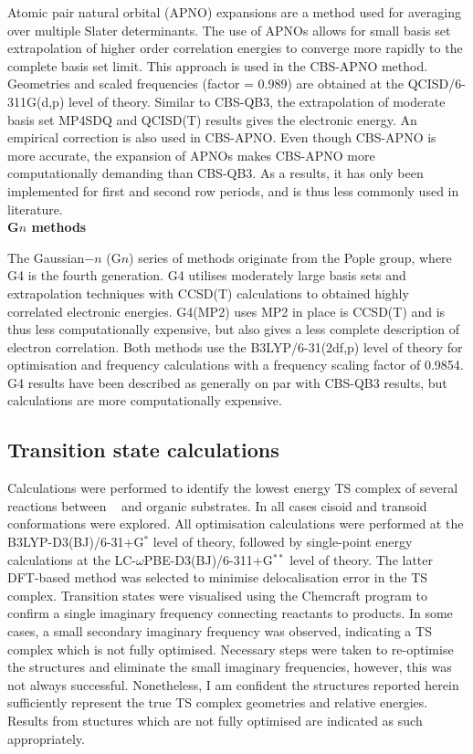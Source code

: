 Atomic pair natural orbital (APNO) expansions are a method used for averaging over multiple Slater determinants. The use of APNOs allows for small basis set extrapolation of higher order correlation energies to converge more rapidly to the complete basis set limit. This approach is used in the CBS-APNO method.\cite{Ochterski1996} Geometries and scaled frequencies (factor = 0.989) are obtained at the QCISD/6-311G(d,p) level of theory. Similar to CBS-QB3, the extrapolation of moderate basis set MP4SDQ and QCISD(T) results gives the electronic energy. An empirical correction is also used in CBS-APNO. Even though CBS-APNO is more accurate, the expansion of APNOs makes CBS-APNO more computationally demanding than CBS-QB3. As a results, it has only been implemented for first and second row periods, and is thus less commonly used in literature.
\\

\noindent \textbf{G$n$ methods}

The Gaussian$-n$ (G$n$) series of methods originate from the Pople group,\cite{Pople1989} where G4 is the fourth generation. G4 utilises moderately large basis sets and extrapolation techniques with CCSD(T) calculations to obtained highly correlated electronic energies. G4(MP2) uses MP2 in place is CCSD(T) and is thus less computationally expensive, but also gives a less complete description of electron correlation. Both methods use the B3LYP/6-31(2df,p) level of theory for optimisation and frequency calculations with a frequency scaling factor of 0.9854. G4 results have been described as generally on par with CBS-QB3 results,\cite{Somers2015, Simmie2015} but calculations are more computationally expensive.

\subsection{Transition state calculations}

Calculations were performed to identify the lowest energy TS complex of several reactions between \cumo~ and organic substrates. In all cases cisoid and transoid conformations were explored. All optimisation calculations were performed at the B3LYP-D3(BJ)/6-31+G$^*$ level of theory, followed by single-point energy calculations at the LC-$\omega$PBE-D3(BJ)/6-311+G$^{**}$ level of theory. The latter DFT-based method was selected to minimise delocalisation error in the TS complex.\cite{OterodelaRoza2014} Transition states were visualised using the Chemcraft program\cite{ccraft} to confirm a single imaginary frequency connecting reactants to products. In some cases, a small secondary imaginary frequency was observed, indicating a TS complex which is not fully optimised. Necessary steps were taken to re-optimise the structures and eliminate the small imaginary frequencies, however, this was not always successful. Nonetheless, I am confident the structures reported herein sufficiently represent the true TS complex geometries and relative energies. Results from stuctures which are not fully optimised are indicated as such appropriately.

